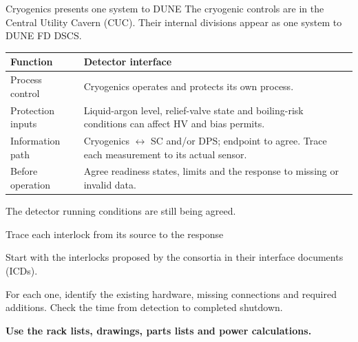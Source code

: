 \documentclass[aspectratio=169,11pt]{beamer}
\begin{document}
\begin{frame}{Cryogenics presents one system to DUNE}
The cryogenic controls are in the Central Utility Cavern (CUC).
Their internal divisions appear as one system to DUNE FD DSCS.\par\bigskip
\renewcommand{\arraystretch}{1.3}
\begin{tabularx}{\textwidth}{@{}>{\RaggedRight\arraybackslash}p{3cm}>{\RaggedRight\arraybackslash}X@{}}
\toprule
\textbf{Function} & \textbf{Detector interface}\\\midrule
Process control & Cryogenics operates and protects its own process.\\
Protection inputs & Liquid-argon level, relief-valve state and boiling-risk conditions can affect HV and bias permits.\\
Information path & Cryogenics $\leftrightarrow$ SC and/or DPS; endpoint to agree. Trace each measurement to its actual sensor.\\
Before operation & Agree readiness states, limits and the response to missing or invalid data.\\
\bottomrule
\end{tabularx}\par\medskip
The detector running conditions are still being agreed.
\end{frame}

\begin{frame}{Trace each interlock from its source to the response}
\centering
{}\par\smallskip
\raggedright{}\par\smallskip
\raggedright

Start with the interlocks proposed by the consortia in their interface documents (ICDs).\par\bigskip
For each one, identify the existing hardware, missing connections and required additions. Check the time from detection to completed shutdown.\par\bigskip
\textbf{Use the rack lists, drawings, parts lists and power calculations.}
\end{frame}
\end{document}
